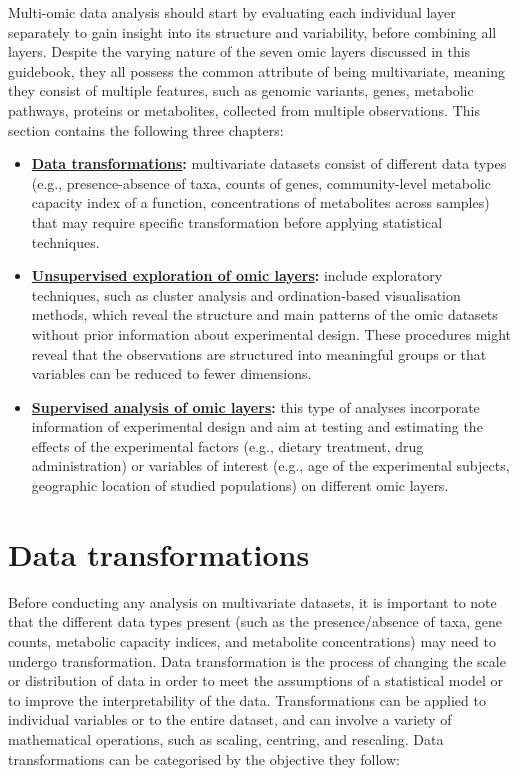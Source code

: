 \documentclass[
]{book}
\providecommand{\tightlist}{%
  \setlength{\itemsep}{0pt}\setlength{\parskip}{0pt}}
\begin{document}
Multi-omic data analysis should start by evaluating each individual layer separately to gain insight into its structure and variability, before combining all layers. Despite the varying nature of the seven omic layers discussed in this guidebook, they all possess the common attribute of being multivariate, meaning they consist of multiple features, such as genomic variants, genes, metabolic pathways, proteins or metabolites, collected from multiple observations. This section contains the following three chapters:

\begin{itemize}
\tightlist
\item
  \textbf{\protect\hyperlink{data-transformations}{Data transformations}:} multivariate datasets consist of different data types (e.g., presence-absence of taxa, counts of genes, community-level metabolic capacity index of a function, concentrations of metabolites across samples) that may require specific transformation before applying statistical techniques.
\item
  \textbf{\protect\hyperlink{unsupervised-exploration}{Unsupervised exploration of omic layers}:} include exploratory techniques, such as cluster analysis and ordination-based visualisation methods, which reveal the structure and main patterns of the omic datasets without prior information about experimental design. These procedures might reveal that the observations are structured into meaningful groups or that variables can be reduced to fewer dimensions.
\item
  \textbf{\protect\hyperlink{supervised-analysis}{Supervised analysis of omic layers}:} this type of analyses incorporate information of experimental design and aim at testing and estimating the effects of the experimental factors (e.g., dietary treatment, drug administration) or variables of interest (e.g., age of the experimental subjects, geographic location of studied populations) on different omic layers.
\end{itemize}

\hypertarget{data-transformations}{%
\chapter{Data transformations}\label{data-transformations}}

Before conducting any analysis on multivariate datasets, it is important to note that the different data types present (such as the presence/absence of taxa, gene counts, metabolic capacity indices, and metabolite concentrations) may need to undergo transformation. Data transformation is the process of changing the scale or distribution of data in order to meet the assumptions of a statistical model or to improve the interpretability of the data. Transformations can be applied to individual variables or to the entire dataset, and can involve a variety of mathematical operations, such as scaling, centring, and rescaling. Data transformations can be categorised by the objective they follow:
\end{document}

